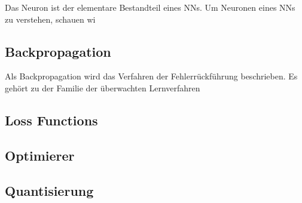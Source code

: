 Das Neuron ist der elementare Bestandteil eines \acp{NN}.
Um Neuronen eines \acp{NN} zu verstehen, schauen wi



\subsection{Backpropagation}
Als Backpropagation wird das Verfahren der Fehlerrückführung beschrieben. Es gehört zu der Familie der überwachten Lernverfahren





\subsection{Loss Functions}

\subsection{Optimierer}


\subsection{Quantisierung}

